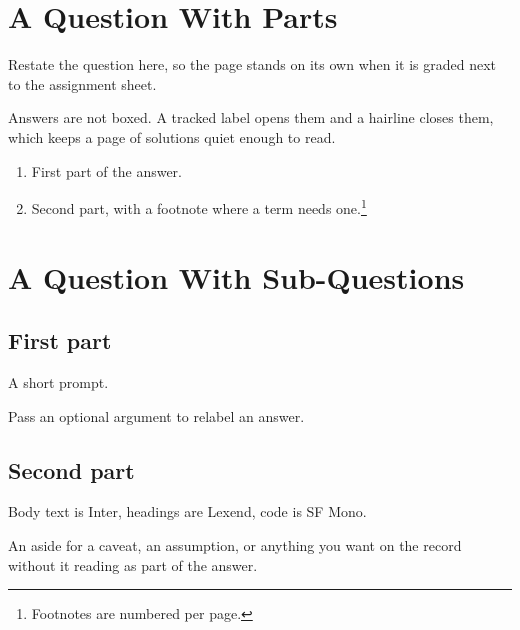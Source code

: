 \section{A Question With Parts }

\begin{question}
    Restate the question here, so the page stands on its own when it is
    graded next to the assignment sheet.
\end{question}

\begin{answer}
    Answers are not boxed. A tracked label opens them and a hairline closes
    them, which keeps a page of solutions quiet enough to read.

    \begin{enumerate}
        \item First part of the answer.
        \item Second part, with a footnote where a term needs one.\footnote{%
              Footnotes are numbered per page.}
    \end{enumerate}

\end{answer}

\section{A Question With Sub-Questions }

\subsection{First part}

\begin{question}
    A short prompt.
\end{question}

\begin{answer}[Part a]
    Pass an optional argument to relabel an answer.
\end{answer}

\subsection{Second part}

\begin{answer}
    Body text is Inter, headings are Lexend, code is SF Mono.

    \begin{aside}
        An aside for a caveat, an assumption, or anything you want on the
        record without it reading as part of the answer.
    \end{aside}
\end{answer}
